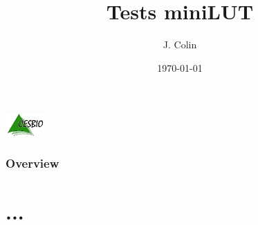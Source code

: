 \documentclass[8pt]{beamer}
\title{Tests miniLUT}
\author{J. Colin\inst{1}}%
\institute{\inst{1}Centre d'\'Etudes Spatiales de la Biosph\`ere, France \url{jerome.colin@cesbio.cnes.fr}\\
}
\date{\today} %
\begin{document}
{
	\begin{frame}
		\vspace{.8cm}
		\includegraphics[width=1.5cm]{logo_cesbio_transp.pdf}
	\titlepage %
	\end{frame}
}

\begin{frame}
	\frametitle{Overview}
	\tableofcontents
\end{frame}


\section{...} 

%
%	
%	
\end{document}
